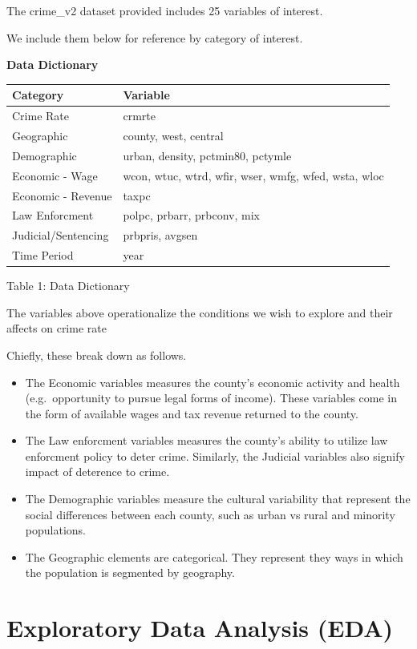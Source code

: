 \documentclass[]{article}
\begin{document}
The crime\_v2 dataset provided includes 25 variables of interest.

We include them below for reference by category of interest.

\begin{center}
\textbf{Data Dictionary}
\end{center}

\begin{longtable}[]{@{}ll@{}}
\toprule
Category & Variable\tabularnewline
\midrule
\endhead
Crime Rate & crmrte\tabularnewline
Geographic & county, west, central\tabularnewline
Demographic & urban, density, pctmin80, pctymle\tabularnewline
Economic - Wage & wcon, wtuc, wtrd, wfir, wser, wmfg, wfed, wsta,
wloc\tabularnewline
Economic - Revenue & taxpc\tabularnewline
Law Enforcment & polpc, prbarr, prbconv, mix\tabularnewline
Judicial/Sentencing & prbpris, avgsen\tabularnewline
Time Period & year\tabularnewline
\bottomrule
\end{longtable}

\begin{center}
Table 1: Data Dictionary
\end{center}

The variables above operationalize the conditions we wish to explore and
their affects on crime rate

Chiefly, these break down as follows.

\begin{itemize}
\item
  The Economic variables measures the county's economic activity and
  health (e.g.~opportunity to pursue legal forms of income). These
  variables come in the form of available wages and tax revenue returned
  to the county.
\item
  The Law enforcment variables measures the county's ability to utilize
  law enforcment policy to deter crime. Similarly, the Judicial
  variables also signify impact of deterence to crime.
\item
  The Demographic variables measure the cultural variability that
  represent the social differences between each county, such as urban vs
  rural and minority populations.
\item
  The Geographic elements are categorical. They represent they ways in
  which the population is segmented by geography.
\end{itemize}

\hypertarget{exploratory-data-analysis-eda}{%
\section{Exploratory Data Analysis
(EDA)}\label{exploratory-data-analysis-eda}}
\end{document}
